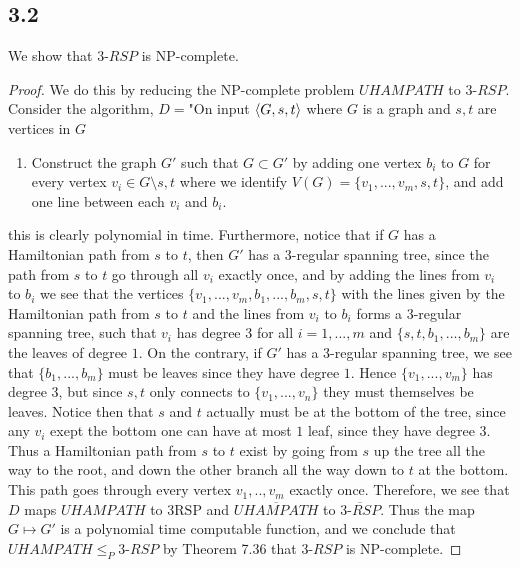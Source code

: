 \documentclass[a4paper,11pt]{article}
\numberwithin{equation}{section}
\begin{document}
\subsection*{3.2}
We show that $ 3\text{-}RSP $ is NP-complete.\begin{proof}
	We do this by reducing the NP-complete problem $ UHAMPATH $ to $ 3\text{-}RSP $. Consider the algorithm, $ D= $"On input $ \braket{G,s,t} $ where $ G $ is a graph and $ s,t $ are vertices in $ G $\begin{enumerate}
		\item Construct the graph $ G' $ such that $ G\subset G' $ by adding one vertex $ b_i $ to $ G $ for every vertex $ v_i\in G\setminus{s,t} $ where we identify $ V(G)=\{v_1,...,v_m,s,t\} $, and add one line between each $ v_i $ and $ b_i $.
	\end{enumerate}
	this is clearly polynomial in time. Furthermore, notice that if $ G $ has a Hamiltonian path from $ s $ to $ t $, then $ G' $ has a 3-regular spanning tree, since the path from $ s $ to $ t $ go through all $ v_i $ exactly once, and by adding the lines from $ v_i $ to $ b_i $ we see that the vertices $ \{v_1,...,v_m,b_1,...,b_m,s,t\} $ with the lines given by the Hamiltonian path from $ s $ to $ t $ and the lines from $ v_i $ to $ b_i $ forms a 3-regular spanning tree, such that $ v_i $ has degree $ 3 $ for all $ i=1,...,m $ and $ \{s,t,b_1,...,b_m\} $ are the leaves of degree $ 1 $. On the contrary, if $ G' $ has a 3-regular spanning tree, we see that $ \{b_1,...,b_m\} $ must be leaves since they have degree $ 1 $. Hence $ \{v_1,...,v_m\} $ has degree 3, but since $ s,t $ only connects to $ \{v_1,...,v_n\} $ they must themselves be leaves. Notice then that $ s $ and $ t $ actually must be at the bottom of the tree, since any $ v_i $ exept the bottom one can have at most $ 1 $ leaf, since they have degree $ 3 $. Thus a Hamiltonian path from $ s $ to $ t $ exist by going from $ s $ up the tree all the way to the root, and down the other branch all the way down to $ t $ at the bottom. This path goes through every vertex $ v_1,..,v_m $ exactly once. Therefore, we see that $ D $ maps $ UHAMPATH $ to $ 3\text{RSP} $ and $ \overline{UHAMPATH} $ to $ \overline{3\text{-}RSP} $. Thus the map $ G\mapsto G' $ is a polynomial time computable function, and we conclude that $ UHAMPATH\leq_P 3\text{-}RSP $ by Theorem 7.36 that $ 3\text{-}RSP $ is NP-complete.
\end{proof}
\end{document}
